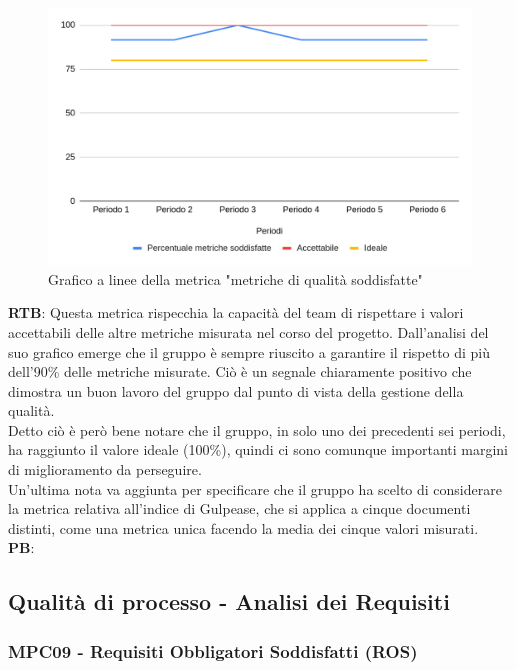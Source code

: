 \documentclass[10pt]{article}
\begin{document}
\begin{justify}
\begin{figure}[H]
  \centering
  \includegraphics[width=0.9\linewidth]{metricheRispettate.png}
  \caption{Grafico a linee della metrica "metriche di qualità soddisfatte"}
  \label{fig:metricheRispettate_chart}
\end{figure}

\textbf{RTB}: Questa metrica rispecchia la capacità del team di rispettare i valori accettabili delle altre metriche misurata nel corso del progetto. Dall'analisi del suo 
grafico emerge che il gruppo è sempre riuscito a garantire il rispetto di più dell'90\% delle metriche misurate. Ciò è un segnale chiaramente positivo che dimostra
un buon lavoro del gruppo dal punto di vista della gestione della qualità.\\
Detto ciò è però bene notare che il gruppo, in solo uno dei precedenti sei periodi, ha raggiunto il valore ideale (100\%), quindi ci sono comunque importanti margini
di miglioramento da perseguire.\\
Un'ultima nota va aggiunta per specificare che il gruppo ha scelto di considerare la metrica relativa all'indice di Gulpease, che si applica a cinque documenti distinti, come 
una metrica unica facendo la media dei cinque valori misurati.\\

\noindent
\textbf{PB}: 



\subsection{Qualità di processo - Analisi dei Requisiti}
\subsubsection{MPC09 - Requisiti Obbligatori Soddisfatti (ROS)}%


\end{justify}
\end{document}
